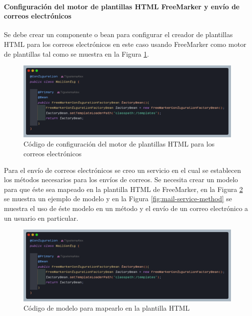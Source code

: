 \paragraph{Configuración del motor de plantillas HTML FreeMarker y envío de correos electrónicos}

Se debe crear un componente o bean para configurar el creador de plantillas HTML para los correos electrónicos en este caso usando FreeMarker como motor de plantillas tal como se muestra en la Figura \ref{fig:freemaker}.

\begin{figure}[H]
    \centering
    \includegraphics[width=1\textwidth]{resources/images/fremaker}
    \caption{Código de configuración del motor de plantillas HTML para los correos electrónicos}
    \label{fig:freemaker}
\end{figure}

Para el envío de correos electrónicos se creo un servicio en el cual se establecen los métodos necesarios para los envíos de correos.
Se necesita crear un modelo para que éste sea mapeado en la plantilla HTML de FreeMarker, en la Figura \ref{fig:mail-service-model} se muestra un ejemplo de modelo y en la Figura \ref{fig:mail-service-method} se muestra el uso de éste modelo en un método y el envío de un correo electrónico a un usuario en particular.

\begin{figure}[H]
    \centering
    \includegraphics[width=1\textwidth]{resources/images/fremaker}
    \caption{Código de modelo para mapearlo en la plantilla HTML}
    \label{fig:mail-service-model}
\end{figure}

